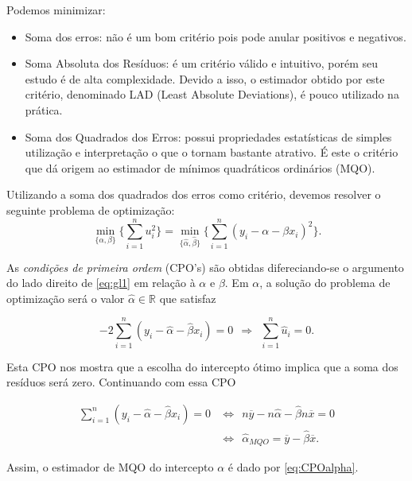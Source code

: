 \documentclass[
]{book}
\theoremstyle{definition}
\theoremstyle{definition}
\theoremstyle{definition}
\theoremstyle{remark}
\begin{document}
Podemos minimizar:

\begin{itemize}
\item
  Soma dos erros: não é um bom critério pois pode anular positivos e negativos.
\item
  Soma Absoluta dos Resíduos: é um critério válido e intuitivo, porém seu estudo é de alta complexidade. Devido a isso, o estimador obtido por este critério, denominado LAD (Least Absolute Deviations), é pouco utilizado na prática.
\item
  Soma dos Quadrados dos Erros: possui propriedades estatísticas de simples utilização e interpretação o que o tornam bastante atrativo. É este o critério que dá origem ao estimador de mínimos quadráticos ordinários (MQO).
\end{itemize}

Utilizando a soma dos quadrados dos erros como critério, devemos resolver o seguinte problema de optimização:
\begin{equation}
\min_{\{\alpha,\beta\}}\bigg\{\sum_{i=1}^n u_i^2\bigg\} = \min_{\{\widehat{\alpha},\widehat{\beta}\}}\bigg\{\sum_{i=1}^n(y_i-\alpha-\beta x_i)^2\bigg\}.
\label{eq:gl1}
\end{equation}

As \emph{condições de primeira ordem} (CPO's) são obtidas difereciando-se o argumento do lado direito de \eqref{eq:gl1} em relação à \(\alpha\) e \(\beta\). Em \(\alpha\), a solução do problema de optimização será o valor \(\hat{\alpha}\in \mathbb{R}\) que satisfaz

\[-2\sum_{i=1}^n(y_i-\widehat{\alpha}-\widehat{\beta}x_i)=0 \ \ \Longrightarrow \ \ \sum_{i=1}^n \widehat{u}_i=0.\]

Esta CPO nos mostra que a escolha do intercepto ótimo implica que a soma dos resíduos será zero. Continuando com essa CPO

\begin{align}
\nonumber  \sum_{i=1}^n(y_i-\widehat{\alpha}-\widehat{\beta}x_i)=0 &\Longleftrightarrow \ \ n\overline{y}-n\widehat{\alpha}-\widehat{\beta}n\overline{x} = 0 \\
&\Longleftrightarrow \ \  \widehat{\alpha}_{MQO} =  \overline{y}-\widehat{\beta}\overline{x}.
\label{eq:CPOalpha}
\end{align}

Assim, o estimador de MQO do intercepto \(\alpha\) é dado por \eqref{eq:CPOalpha}.
\end{document}
